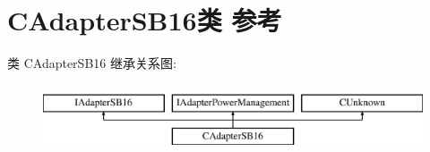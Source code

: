 \hypertarget{class_c_adapter_s_b16}{}\section{C\+Adapter\+S\+B16类 参考}
\label{class_c_adapter_s_b16}
类 C\+Adapter\+S\+B16 继承关系图\+:\begin{figure}[H]
\begin{center}
\leavevmode
\includegraphics[height=2.000000cm]{class_c_adapter_s_b16}
\end{center}
\end{figure}
